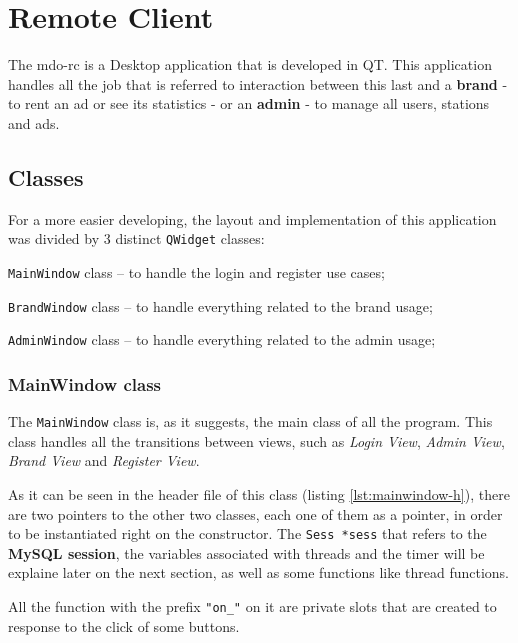\section{Remote Client}
\label{sec:rc}
%
The \gls{mdo-rc} is a Desktop application that is developed in QT.
This application handles all the job that is referred to interaction between this last and a \textbf{brand} - to rent an ad or see its statistics - or an \textbf{admin} - to manage all users, stations and ads.

\subsection{Classes}
\label{sub-sec:classes}
%
For a more easier developing, the layout and implementation of this application was divided by 3 distinct \texttt{QWidget} classes:
\begin{enum-c}
\item \texttt{MainWindow} class -- to handle the login and register use cases;
\item \texttt{BrandWindow} class -- to handle everything related to the brand usage;
\item \texttt{AdminWindow} class -- to handle everything related to the admin usage;
\end{enum-c}

\subsubsection{MainWindow class}
%
The \texttt{MainWindow} class is, as it suggests, the main class of all the program.
This class handles all the transitions between views, such as \emph{Login View}, \emph{Admin View}, \emph{Brand View} and \emph{Register View}.

As it can be seen in the header file of this class (listing \ref{lst:mainwindow-h}), there are two pointers to the other two classes, each one of them as a pointer, in order to be instantiated right on the constructor.
The \texttt{Sess *sess} that refers to the \textbf{MySQL session}, the variables associated with threads and the timer will be explaine later on the next section, as well as some functions like thread functions.
%
%

All the function with the prefix \texttt{"on\_"} on it are private slots that are created to response to the click of some buttons.

